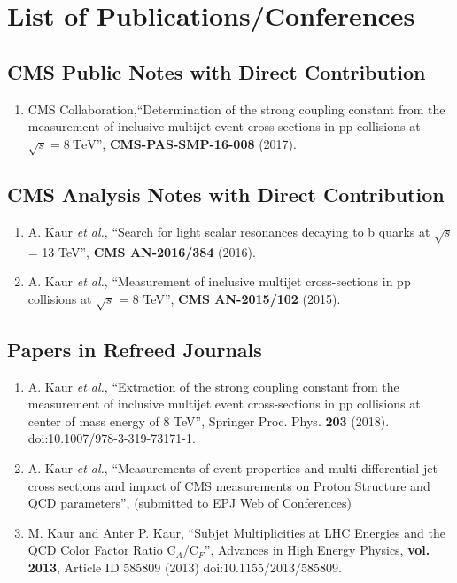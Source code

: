 \chapter*{List of Publications/Conferences} %
\markboth{}{}
\fontsize{11pt}{12pt} \selectfont
\section*{CMS Public Notes with Direct Contribution}

\begin{enumerate}

\item CMS Collaboration,``Determination of the strong coupling constant from the measurement of inclusive multijet event cross sections in pp collisions at $\sqrt{s} = 8~\mathrm{TeV}$'', {\bf CMS-PAS-SMP-16-008} (2017).

\end{enumerate}

\noindent\makebox[\textwidth]{\rule{\textwidth}{1pt}} 

\section*{CMS Analysis Notes with Direct Contribution}
\begin{enumerate}

\item A. Kaur {\it et al.}, ``Search for light scalar resonances decaying to b quarks at $\sqrt{s}$ = 13 TeV'', {\bf CMS AN-2016/384} (2016).

\item A. Kaur {\it et al.}, ``Measurement of inclusive multijet cross-sections in pp collisions at $\sqrt{s}$ = 8 TeV'', {\bf CMS AN-2015/102} (2015).

\end{enumerate}

\noindent\makebox[\textwidth]{\rule{\textwidth}{1pt}} 

\section*{Papers in Refreed Journals}
\begin{enumerate}

\item A. Kaur {\it et al.}, ``Extraction of the strong coupling constant from the measurement of inclusive multijet event cross-sections in pp collisions at center of mass energy of 8 TeV'', Springer Proc. Phys. {\bf 203} (2018). doi:10.1007/978-3-319-73171-1.

\item A. Kaur {\it et al.}, ``Measurements of event properties and multi-differential jet cross sections and impact of CMS measurements on Proton Structure and QCD parameters'', (submitted to EPJ Web of Conferences)

\item M. Kaur and Anter P. Kaur, ``Subjet Multiplicities at LHC Energies and the QCD Color Factor Ratio C$_{A}$/C$_{F}$'', Advances in High Energy Physics, {\bf vol. 2013}, Article ID 585809 (2013) doi:10.1155/2013/585809.
\
\end{enumerate}


